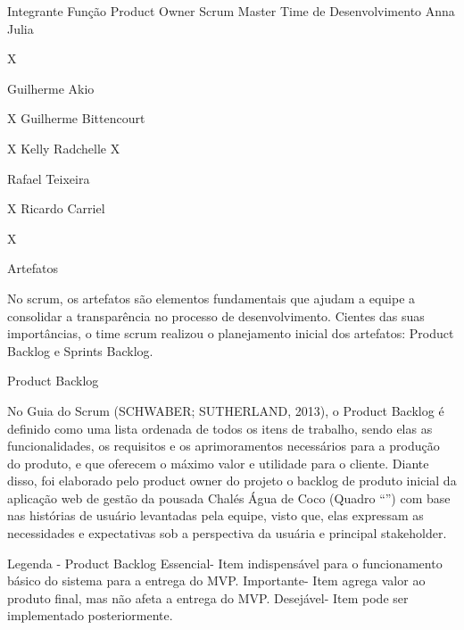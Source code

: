         Integrante
	Função
	Product Owner
	Scrum Master
	Time de Desenvolvimento
	Anna Julia
	

	X
	

	Guilherme Akio
	

	

	X
	Guilherme Bittencourt
	

	

	X
	Kelly Radchelle
	X
	

	

	Rafael Teixeira
	

	

	X
	Ricardo Carriel
	

	

	X
	

        
Artefatos


        No scrum,  os artefatos são elementos fundamentais que ajudam a equipe a consolidar a transparência no processo de desenvolvimento. Cientes das suas importâncias, o time scrum realizou o planejamento inicial dos artefatos: Product Backlog e Sprints Backlog. 


Product Backlog


No Guia do Scrum (SCHWABER; SUTHERLAND, 2013), o Product Backlog é definido como uma lista ordenada de todos os itens de trabalho, sendo elas as funcionalidades, os requisitos e os aprimoramentos necessários para a produção do produto,  e que oferecem o máximo valor e utilidade para o cliente. Diante disso, foi elaborado pelo product owner do projeto o backlog de produto inicial da aplicação web de gestão da pousada Chalés Água de Coco (Quadro “”) com base nas histórias de usuário levantadas pela equipe, visto que, elas expressam as necessidades e expectativas sob a perspectiva da usuária e principal stakeholder.




Legenda - Product Backlog
Essencial- Item indispensável para o funcionamento básico do sistema para a entrega do MVP.
Importante- Item agrega valor ao produto final, mas não afeta a entrega do MVP.
Desejável- Item pode ser implementado posteriormente.




